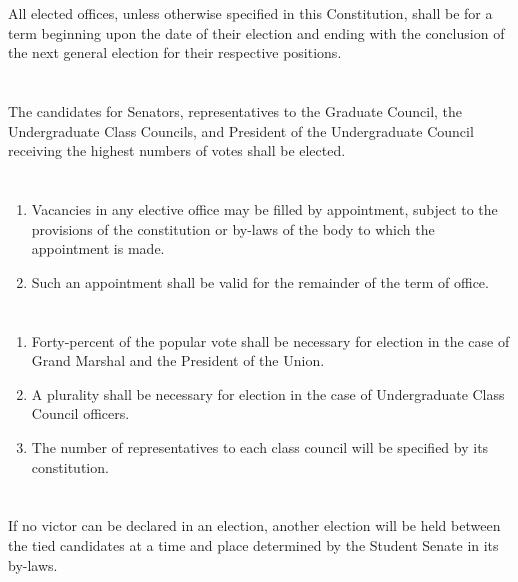 \documentclass[12pt]{constitution}
\begin{document}
\section{}
All elected offices, unless otherwise specified in this Constitution, shall be for a term beginning upon the date of their election and ending with the conclusion of the next general election for their respective
positions.

\section{}
The candidates for Senators, representatives to the Graduate Council, the Undergraduate Class Councils,
and President of the Undergraduate Council receiving the highest numbers of votes shall be elected.

\section{}
\begin{enumerate}
\item Vacancies in any elective office may be filled by appointment, subject to the provisions of the
constitution or by-laws of the body to which the appointment is made.
\item Such an appointment shall be valid for the remainder of the term of office.
\end{enumerate}

\section{}
\begin{enumerate}
\item Forty-percent of the popular vote shall be necessary for election in the case of Grand Marshal
and the President of the Union.
\item A plurality shall be necessary for election in the case of Undergraduate Class Council officers.
\item The number of representatives to each class council will be specified by its constitution.
\end{enumerate}

\section{}
If no victor can be declared in an election, another election will be held between the tied candidates at a
time and place determined by the Student Senate in its by-laws.
\end{document}

